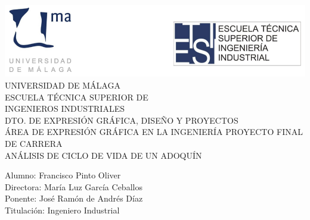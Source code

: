 \begin{titlepage}
\begin{center}
{\centering \includegraphics{img/portada.png}}
\vfill
{\LARGE UNIVERSIDAD DE MÁLAGA\\
ESCUELA TÉCNICA SUPERIOR DE\\[10pt]
INGENIEROS INDUSTRIALES}\\[25pt]
{\large DTO. DE EXPRESIÓN GRÁFICA, DISEÑO Y PROYECTOS\\
ÁREA DE EXPRESIÓN GRÁFICA EN LA INGENIERÍA}
\vfill
{\Large PROYECTO FINAL DE CARRERA\\[10pt]
ANÁLISIS DE CICLO DE VIDA DE UN ADOQUÍN}
\end{center}
\vfill
\begin{flushright}
Alumno: Francisco Pinto Oliver\\
Directora: María Luz García Ceballos\\
Ponente: José Ramón de Andrés Díaz\\
Titulación: Ingeniero Industrial
\end{flushright}
\end{titlepage}
